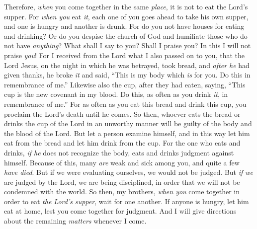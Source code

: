 \begin{biblechapter}
\verse Therefore, \textit{when} you come together in the same \textit{place}, it is not to eat the Lord’s supper.
\verse For \textit{when you} eat \textit{it}, each one of you goes ahead to take his own supper, and one is hungry and another is drunk.
\verse For do you not have houses for eating and drinking? Or do you despise the church of God and humiliate those who do not have \textit{anything}? What shall I say to you? Shall I praise you? In this I will not praise \textit{you}!
\verse For I received from the Lord what I also passed on to you, that the Lord Jesus, on the night in which he was betrayed, took bread,
\verse and \textit{after he} had given thanks, he broke \textit{it} and said, “This is my body which \textit{is} for you. Do this in remembrance of me.”
\verse Likewise also the cup, after they had eaten, saying, “This cup is the new covenant in my blood. Do this, as often as you drink \textit{it}, in remembrance of me.”
\verse For as often as you eat this bread and drink this cup, you proclaim the Lord’s death until he comes.
\verse So then, whoever eats the bread or drinks the cup of the Lord in an unworthy manner will be guilty of the body and the blood of the Lord.
\verse But let a person examine himself, and in this way let him eat from the bread and let him drink from the cup.
\verse For the one who eats and drinks, \textit{if he} does not recognize the body, eats and drinks judgment against himself.
\verse Because of this, many \textit{are} weak and sick among you, and quite a few \textit{have died}.
\verse But if we were evaluating ourselves, we would not be judged.
\verse But \textit{if we} are judged by the Lord, we are being disciplined, in order that we will not be condemned with the world.
\verse So then, my brothers, \textit{when you} come together in order to eat \textit{the Lord’s supper}, wait for one another.
\verse If anyone is hungry, let him eat at home, lest you come together for judgment. And I will give directions about the remaining \textit{matters} whenever I come.
\end{biblechapter}

